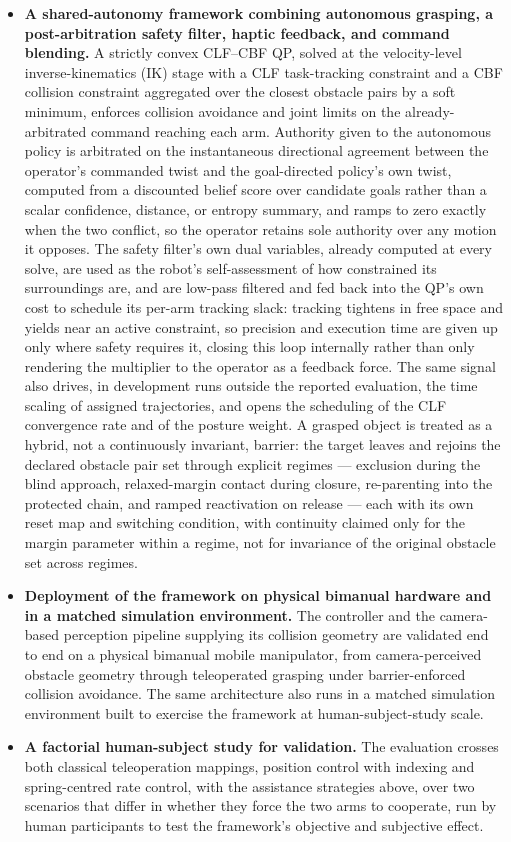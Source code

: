 \begin{itemize}[nosep]
\item \textbf{A shared-autonomy framework combining autonomous grasping, a post-arbitration safety filter, haptic feedback, and command blending.} A strictly convex CLF--CBF QP, solved at the velocity-level inverse-kinematics (IK) stage with a CLF task-tracking constraint and a CBF collision constraint aggregated over the closest obstacle pairs by a soft minimum, enforces collision avoidance and joint limits on the already-arbitrated command reaching each arm. Authority given to the autonomous policy is arbitrated on the instantaneous directional agreement between the operator's commanded twist and the goal-directed policy's own twist, computed from a discounted belief score over candidate goals rather than a scalar confidence, distance, or entropy summary, and ramps to zero exactly when the two conflict, so the operator retains sole authority over any motion it opposes. The safety filter's own dual variables, already computed at every solve, are used as the robot's self-assessment of how constrained its surroundings are, and are low-pass filtered and fed back into the QP's own cost to schedule its per-arm tracking slack: tracking tightens in free space and yields near an active constraint, so precision and execution time are given up only where safety requires it, closing this loop internally rather than only rendering the multiplier to the operator as a feedback force. The same signal also drives, in development runs outside the reported evaluation, the time scaling of assigned trajectories, and opens the scheduling of the CLF convergence rate and of the posture weight. A grasped object is treated as a hybrid, not a continuously invariant, barrier: the target leaves and rejoins the declared obstacle pair set through explicit regimes --- exclusion during the blind approach, relaxed-margin contact during closure, re-parenting into the protected chain, and ramped reactivation on release --- each with its own reset map and switching condition, with continuity claimed only for the margin parameter within a regime, not for invariance of the original obstacle set across regimes.
\item \textbf{Deployment of the framework on physical bimanual hardware and in a matched simulation environment.} The controller and the camera-based perception pipeline supplying its collision geometry are validated end to end on a physical bimanual mobile manipulator, from camera-perceived obstacle geometry through teleoperated grasping under barrier-enforced collision avoidance. The same architecture also runs in a matched simulation environment built to exercise the framework at human-subject-study scale.
\item \textbf{A factorial human-subject study for validation.} The evaluation crosses both classical teleoperation mappings, position control with indexing and spring-centred rate control, with the assistance strategies above, over two scenarios that differ in whether they force the two arms to cooperate, run by human participants to test the framework's objective and subjective effect.
\end{itemize}

